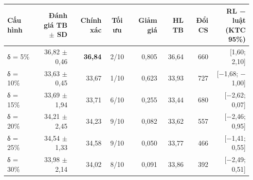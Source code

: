 \begin{tabular}{lrrcrrrr}
\toprule
Cấu hình & \makecell[r]{Đánh giá TB\\\(\pm\) SD} & Chính xác & Tối ưu & Giảm giá & HL TB & Đổi CS & \makecell[r]{RL − luật\\(KTC 95\%)} \\
\midrule
δ = 5\% & 36{,}82 $\pm$ 0{,}46 & \textbf{36{,}84} & 2/10 & 0{,}805 & 36{,}64 & 660 & [1{,}60; 2{,}10] \\
δ = 10\% & 33{,}63 $\pm$ 0{,}45 & 33{,}67 & 1/10 & 0{,}623 & 33{,}93 & 727 & [\ensuremath{-}1{,}68; \ensuremath{-}1{,}00] \\
δ = 15\% & 33{,}69 $\pm$ 1{,}94 & 33{,}71 & 6/10 & 0{,}255 & 33{,}44 & 680 & [\ensuremath{-}2{,}62; 0{,}07] \\
δ = 20\% & 34{,}21 $\pm$ 2{,}45 & 34{,}23 & 9/10 & 0{,}082 & 33{,}62 & 557 & [\ensuremath{-}2{,}46; 0{,}95] \\
δ = 25\% & 34{,}54 $\pm$ 1{,}33 & 34{,}58 & 9/10 & 0{,}050 & 33{,}77 & 466 & [\ensuremath{-}1{,}41; 0{,}55] \\
δ = 30\% & 33{,}98 $\pm$ 2{,}14 & 34{,}02 & 8/10 & 0{,}091 & 33{,}86 & 392 & [\ensuremath{-}2{,}49; 0{,}51] \\
\bottomrule
\end{tabular}
